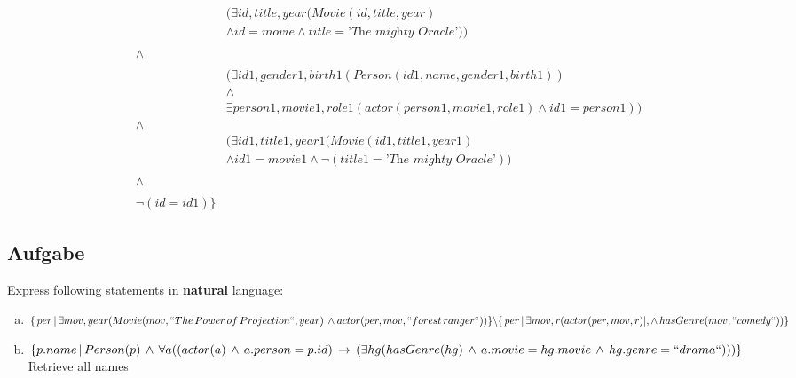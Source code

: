 \documentclass[11pt,a4paper,DIV=9]{scrartcl}
\newcounter{temp}
\newcommand{\aufgabe}[1]{
  \setcounter{temp}{\value{subsection}}
  \setcounter{subsection}{#1}
  \addtocounter{subsection}{-1}
  \subsection{Aufgabe}
  \setcounter{subsection}{\value{temp}}
}
\begin{document}
\begin{description}
\begin{align*}
                      & (\exists id, title, year (Movie(id, title, year)\\
                      & \wedge id = movie \wedge title=\textit{'The mighty Oracle'}))\\
                      &\\
                      \wedge\,\,\,\,\, &\\
                      &\\
                      & (\exists id1, gender1, birth1 (Person(id1, name, gender1, birth1))\\
                      &\wedge \\
                      & \exists person1,movie1,role1(actor(person1, movie1, role1) \wedge id1 = person1))\\
                      \wedge &\\
                      & (\exists id1, title1, year1 (Movie(id1, title1, year1)\\
                      & \wedge id1 = movie1 \wedge \neg(title1=\textit{'The mighty Oracle'}))\\
                      &\\
                      \wedge\,\,\,\,\, &\\
                      &\\
                      \neg(id = id1)
                      \}
                      \end{align*}
        \end{description}
\aufgabe{2}
Express following statements in \textbf{natural} language:
 \begin{enumerate}[a)]
   \item 
   $ 
   \{\, per \, | \, \exists mov, year (\\ 
   Movie(mov, ``The \, Power \, of \, Projection``, year) \,  \wedge \, \\actor(per,mov, ``forest \, ranger``)\\ 
   ) \} \backslash \{ \,per \, | \, \exists mov, r(actor(per, mov, r) |, \wedge \, hasGenre(mov, ``comedy``))\}
   $
   \item 
   $
   \{p.name \, | \, Person(p) \, \wedge \, \forall a(\\  
   (actor(a) \, \wedge \, a.person=p.id) \, \rightarrow \, (\\
   \exists hg(hasGenre(hg) \, \wedge \, a.movie=hg.movie \, \wedge \, hg.genre=``drama``)
   \\)\\)\}
   $
   Retrieve all names
 \end{enumerate}
\end{document}
